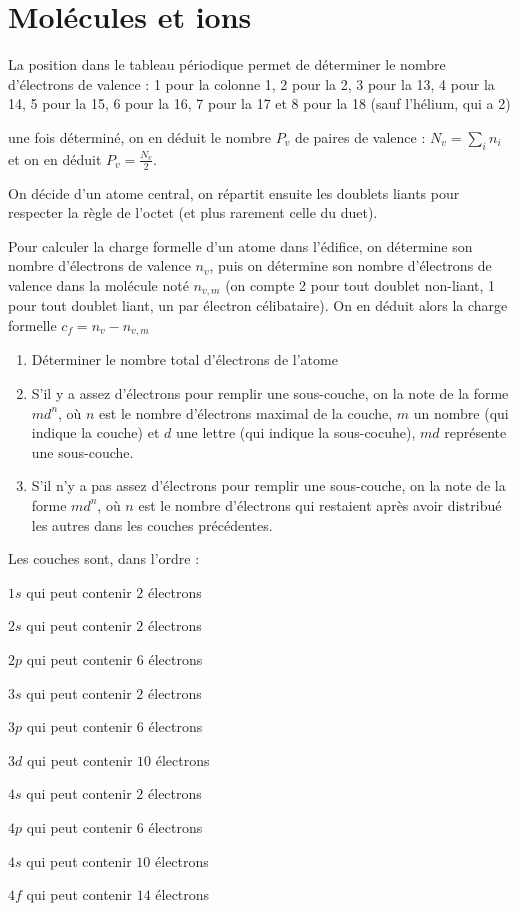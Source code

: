 \documentclass[a4paper,12pt]{book}
\newcommand{\Meth}[2]{\begin{tcolorbox}[colback=white,colframe=green!60!green!30!black!75, title=Méthode :  #1]#2\end{tcolorbox}}
\begin{document}
\section{Molécules et ions}
\Meth{Déterminer un schéma de Lewis}{La position dans le tableau périodique permet de déterminer le nombre d'électrons de valence : 1 pour la colonne 1, 2 pour la 2, 3 pour la 13, 4 pour la 14, 5 pour la 15, 6 pour la 16, 7 pour la 17 et 8 pour la 18 (sauf l'hélium, qui a 2)
\par une fois déterminé, on en déduit le nombre $P_v$ de paires de valence : $N_v = \sum\limits_{i}n_i$ et on en déduit $P_v=\frac{N_v}{2}$.
\par On décide d'un atome central, on répartit ensuite les doublets liants pour respecter la règle de l'octet (et plus rarement celle du duet).
\par Pour calculer la charge formelle d'un atome dans l'édifice, on détermine son nombre d'électrons de valence $n_v$, puis on détermine son nombre d'électrons de valence dans la molécule noté $n_{v,m}$ (on compte 2 pour tout doublet non-liant, 1 pour tout doublet liant, un par électron célibataire). On en déduit alors la charge formelle $c_f = n_v-n_{v,m}$ 
}

\Meth{Déterminer la configuration électronique}{\begin{enumerate}
\item Déterminer le nombre total d'électrons de l'atome
\item S'il y a assez d'électrons pour remplir une sous-couche, on la note de la forme $md^n$, où $n$ est le nombre d'électrons maximal de la couche, $m$ un nombre (qui indique la couche) et $d$ une lettre (qui indique la sous-cocuhe), $md$ représente une sous-couche.
\item S'il n'y a pas assez d'électrons pour remplir une sous-couche, on la note de la forme $md^n$, où $n$ est le nombre d'électrons qui restaient après avoir distribué les autres dans les couches précédentes.
\end{enumerate}
Les couches sont, dans l'ordre :
\par $1s$ qui peut contenir $2$ électrons
\par $2s$ qui peut contenir $2$ électrons
\par $2p$ qui peut contenir $6$ électrons
\par $3s$ qui peut contenir $2$ électrons
\par $3p$ qui peut contenir $6$ électrons
\par $3d$ qui peut contenir $10$ électrons
\par $4s$ qui peut contenir $2$ électrons
\par $4p$ qui peut contenir $6$ électrons
\par $4s$ qui peut contenir $10$ électrons
\par $4f$ qui peut contenir $14$ électrons
}
\end{document}
